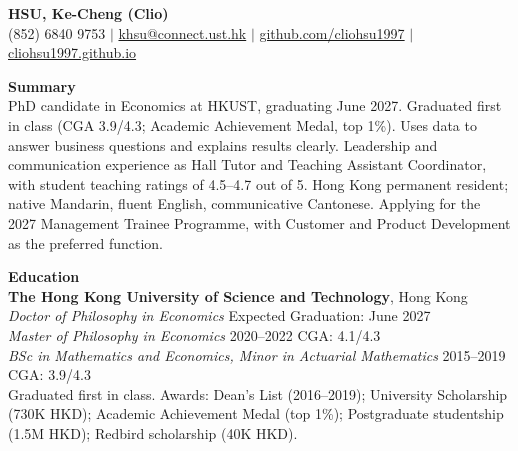 ﻿\documentclass[11pt,letterpaper]{article}
\begin{document}
{\Large \textbf{HSU, Ke-Cheng (Clio)}}\\[1pt]
(852) 6840 9753 \quad $|$ \quad \href{mailto:khsu@connect.ust.hk}{khsu@connect.ust.hk} \quad $|$ \quad \href{https://github.com/cliohsu1997}{github.com/cliohsu1997} \quad $|$ \quad \href{https://cliohsu1997.github.io}{cliohsu1997.github.io}

\vspace{16pt}

{\large \textbf{Summary}}\\[-0.5pt]
PhD candidate in Economics at HKUST, graduating June 2027. Graduated first in class (CGA 3.9/4.3; Academic Achievement Medal, top 1\%). Uses data to answer business questions and explains results clearly. Leadership and communication experience as Hall Tutor and Teaching Assistant Coordinator, with student teaching ratings of 4.5--4.7 out of 5. Hong Kong permanent resident; native Mandarin, fluent English, communicative Cantonese. Applying for the 2027 Management Trainee Programme, with Customer and Product Development as the preferred function.

\vspace{16pt}

{\large \textbf{Education}}\\[-0.5pt]
\textbf{The Hong Kong University of Science and Technology}, Hong Kong\\
\textit{Doctor of Philosophy in Economics} \hfill Expected Graduation: June 2027\\
\textit{Master of Philosophy in Economics} \hfill 2020--2022 \quad CGA: 4.1/4.3\\
\textit{BSc in Mathematics and Economics, Minor in Actuarial Mathematics} \hfill 2015--2019 \quad CGA: 3.9/4.3\\
Graduated first in class. Awards: Dean's List (2016--2019); University Scholarship (730K HKD); Academic Achievement Medal (top 1\%); Postgraduate studentship (1.5M HKD); Redbird scholarship (40K HKD).

\vspace{16pt}
\end{document}

